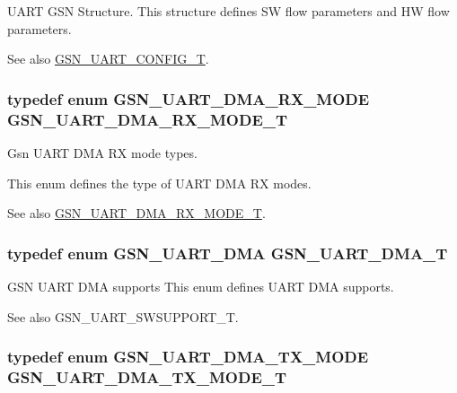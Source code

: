 UART GSN Structure. This structure defines SW flow parameters and HW flow parameters. 

\begin{DoxySeeAlso}{See also}
\hyperlink{a00656_gab793201a4cc37e8cf27b0b640b1f37bc}{GSN\_\-UART\_\-CONFIG\_\-T}. 
\end{DoxySeeAlso}
\hypertarget{a00656_ga14b3640ffe5cd4028623beae5472da4a}{
\subsubsection[{GSN\_\-UART\_\-DMA\_\-RX\_\-MODE\_\-T}]{\setlength{\rightskip}{0pt plus 5cm}typedef enum {\bf GSN\_\-UART\_\-DMA\_\-RX\_\-MODE}  {\bf GSN\_\-UART\_\-DMA\_\-RX\_\-MODE\_\-T}}}
\label{a00656_ga14b3640ffe5cd4028623beae5472da4a}


Gsn UART DMA RX mode types. 

This enum defines the type of UART DMA RX modes. \begin{DoxySeeAlso}{See also}
\hyperlink{a00656_ga14b3640ffe5cd4028623beae5472da4a}{GSN\_\-UART\_\-DMA\_\-RX\_\-MODE\_\-T}. 
\end{DoxySeeAlso}
\hypertarget{a00656_gafc3ee1b15b6b7039d697e48cabeba7de}{
\subsubsection[{GSN\_\-UART\_\-DMA\_\-T}]{\setlength{\rightskip}{0pt plus 5cm}typedef enum {\bf GSN\_\-UART\_\-DMA} {\bf GSN\_\-UART\_\-DMA\_\-T}}}
\label{a00656_gafc3ee1b15b6b7039d697e48cabeba7de}


GSN UART DMA supports This enum defines UART DMA supports. 

\begin{DoxySeeAlso}{See also}
GSN\_\-UART\_\-SWSUPPORT\_\-T. 
\end{DoxySeeAlso}
\hypertarget{a00656_gaca97ddd99d6a776d3991457a1113f687}{
\subsubsection[{GSN\_\-UART\_\-DMA\_\-TX\_\-MODE\_\-T}]{\setlength{\rightskip}{0pt plus 5cm}typedef enum {\bf GSN\_\-UART\_\-DMA\_\-TX\_\-MODE}  {\bf GSN\_\-UART\_\-DMA\_\-TX\_\-MODE\_\-T}}}
\label{a00656_gaca97ddd99d6a776d3991457a1113f687}


